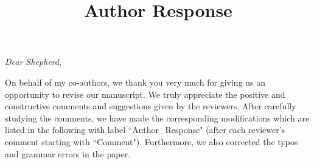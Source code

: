 \documentclass[]{article}
\title{Author Response}
\author{}
\date{}
\begin{document}
\maketitle



\noindent\textit{Dear Shepherd}, 

On behalf of my co-authors, we thank you very much for giving us an opportunity to revise our manuscript. We truly appreciate the positive and constructive comments and suggestions given by the reviewers. After carefully studying the comments, we have made the corresponding modifications which are listed in the following with label ``Author\_Response" (after each reviewer’s comment starting with ``Comment"). Furthermore, we also corrected the typos and grammar errors in the paper. 
\end{document}
